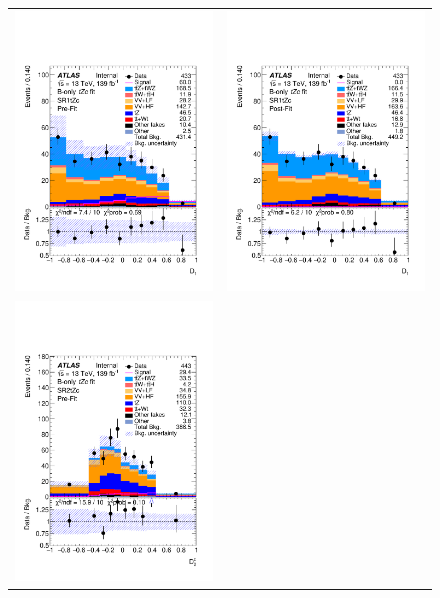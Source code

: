 \clearpage
\begin{figure}[htbp]
	\centering
	\begin{tabular}{cc}
		\includegraphics[width=.45\textwidth]{Chapters/CH8/figures/BONLY_CRSR_DL1rc_unblind/Plots/SR1} &
		\includegraphics[width=.45\textwidth]{Chapters/CH8/figures/BONLY_CRSR_DL1rc_unblind/Plots/SR1_postFit} \\
		\includegraphics[width=.45\textwidth]{Chapters/CH8/figures/BONLY_CRSR_DL1rc_unblind/Plots/SR2} &

\end{tabular}
\end{figure}
